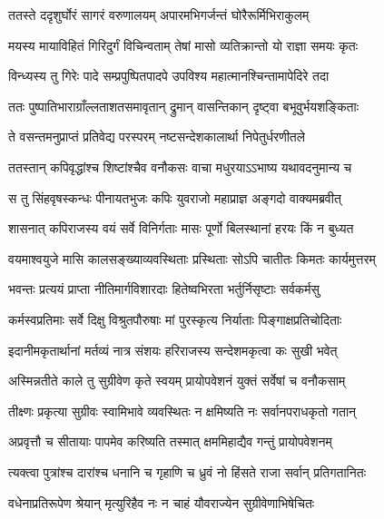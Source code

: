 
\twolineshloka
{ततस्ते ददृशुर्घोरं सागरं वरुणालयम्}
{अपारमभिगर्जन्तं घोरैरूर्मिभिराकुलम्} %

\twolineshloka
{मयस्य मायाविहितं गिरिदुर्गं विचिन्वताम्}
{तेषां मासो व्यतिक्रान्तो यो राज्ञा समयः कृतः} %

\twolineshloka
{विन्ध्यस्य तु गिरेः पादे सम्प्रपुष्पितपादपे}
{उपविश्य महात्मानश्चिन्तामापेदिरे तदा} %

\twolineshloka
{ततः पुष्पातिभाराग्राँल्लताशतसमावृतान्}
{द्रुमान् वासन्तिकान् दृष्ट्वा बभूवुर्भयशङ्किताः} %

\twolineshloka
{ते वसन्तमनुप्राप्तं प्रतिवेद्य परस्परम्}
{नष्टसन्देशकालार्था निपेतुर्धरणीतले} %

\twolineshloka
{ततस्तान् कपिवृद्धांश्च शिष्टांश्चैव वनौकसः}
{वाचा मधुरयाऽऽभाष्य यथावदनुमान्य च} %

\twolineshloka
{स तु सिंहवृषस्कन्धः पीनायतभुजः कपिः}
{युवराजो महाप्राज्ञ अङ्गदो वाक्यमब्रवीत्} %

\twolineshloka
{शासनात् कपिराजस्य वयं सर्वे विनिर्गताः}
{मासः पूर्णो बिलस्थानां हरयः किं न बुध्यत} %

\twolineshloka
{वयमाश्वयुजे मासि कालसङ्ख्याव्यवस्थिताः}
{प्रस्थिताः सोऽपि चातीतः किमतः कार्यमुत्तरम्} %

\twolineshloka
{भवन्तः प्रत्ययं प्राप्ता नीतिमार्गविशारदाः}
{हितेष्वभिरता भर्तुर्निसृष्टाः सर्वकर्मसु} %

\twolineshloka
{कर्मस्वप्रतिमाः सर्वे दिक्षु विश्रुतपौरुषाः}
{मां पुरस्कृत्य निर्याताः पिङ्गाक्षप्रतिचोदिताः} %

\twolineshloka
{इदानीमकृतार्थानां मर्तव्यं नात्र संशयः}
{हरिराजस्य सन्देशमकृत्वा कः सुखी भवेत्} %

\twolineshloka
{अस्मिन्नतीते काले तु सुग्रीवेण कृते स्वयम्}
{प्रायोपवेशनं युक्तं सर्वेषां च वनौकसाम्} %

\twolineshloka
{तीक्ष्णः प्रकृत्या सुग्रीवः स्वामिभावे व्यवस्थितः}
{न क्षमिष्यति नः सर्वानपराधकृतो गतान्} %

\twolineshloka
{अप्रवृत्तौ च सीतायाः पापमेव करिष्यति}
{तस्मात् क्षममिहाद्यैव गन्तुं प्रायोपवेशनम्} %

\twolineshloka
{त्यक्त्वा पुत्रांश्च दारांश्च धनानि च गृहाणि च}
{ध्रुवं नो हिंसते राजा सर्वान् प्रतिगतानितः} %

\twolineshloka
{वधेनाप्रतिरूपेण श्रेयान् मृत्युरिहैव नः}
{न चाहं यौवराज्येन सुग्रीवेणाभिषेचितः} %

